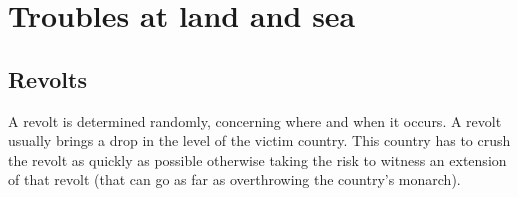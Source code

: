 




\section{Troubles at land and sea}



\subsection{Revolts}

A revolt is determined randomly, concerning where and when it occurs. A revolt
usually brings a drop in the \STAB level of the victim country. This country
has to crush the revolt as quickly as possible otherwise taking the risk to
witness an extension of that revolt (that can go as far as overthrowing the
country's monarch).

